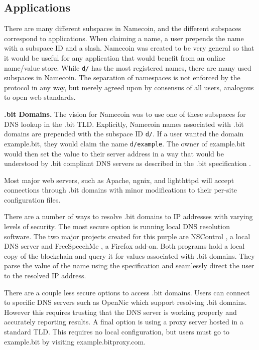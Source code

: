 \subsection{Applications}

There are many different subspaces in Namecoin, and the different subspaces correspond to applications. When claiming a name, a user prepends the name with a subspace ID and a slash. Namecoin was created to be very general so that it would be useful for any application that would benefit from an online name/value store. While {\tt d/} has the most registered names, there are many used subspaces in Namecoin. The separation of namespaces is not enforced by the protocol in any way, but merely agreed upon by consensus of all users, analogous to open web standards.

{\bf .bit Domains.}
The vision for Namecoin was to use one of these subspaces for DNS lookup in the .bit TLD. Explicitly, Namecoin names associated with .bit domains are prepended with the subspace ID {\tt d/}. If a user wanted the domain example.bit, they would claim the name {\tt d/example}. The owner of example.bit would then set the value to their server address in a way that would be understood by .bit compliant DNS servers as described in the .bit specification \cite{bitdnsspec}.

Most major web servers, such as Apache, ngnix, and lighthttpd will accept connections through .bit domains with minor modifications to their per-site configuration files.

There are a number of ways to resolve .bit domains to IP addresses with varying levels of security. The most secure option is running local DNS resolution software. The two major projects created for this purple are NSControl \cite{nmcontrol}, a local DNS server and FreeSpeechMe \cite{freespeechme}, a Firefox add-on. Both programs hold a local copy of the blockchain and query it for values associated with .bit domains. They parse the value of the name using the specification and seamlessly direct the user to the resolved IP address.

There are a couple less secure options to access .bit domains. Users can connect to specific DNS servers such as OpenNic \cite{opennic} which support resolving .bit domains. However this requires trusting that the DNS server is working properly and accurately reporting results. A final option is using a proxy server hosted in a standard TLD. This requires no local configuration, but users must go to example.bit by visiting example.bitproxy.com.

